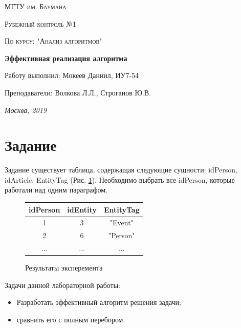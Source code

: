 \documentclass[12pt]{report}
\begin{document}
\begin{titlepage}
	\centering
	{\scshape\LARGE МГТУ им. Баумана \par}
	\vspace{3cm}
	{\scshape\Large Рубежный контроль №1\par}
	\vspace{0.5cm}	
	{\scshape\Large По курсу: "Анализ алгоритмов"\par}
	\vspace{1.5cm}
	{\huge\bfseries Эффективная реализация алгоритма\par}
	\vspace{2cm}
	\Large Работу выполнил: Мокеев Даниил, ИУ7-54\par
	\vspace{0.5cm}
	\Large Преподаватели:  Волкова Л.Л., Строганов Ю.В.\par

	\vfill
	\large \textit {Москва, 2019} \par
\end{titlepage}

\tableofcontents

\newpage
\chapter*{Задание}

Задание существует таблица, содержащая следующие сущности: idPerson, idArticle, EntityTag (Рис. \ref{exp}). Необходимо выбрать все idPerson, которые работали над одним параграфом.
\begin{figure}[h!]
	\begin{center}
		\begin{tabular}{|c c c|} 
			\hline
			idPerson  & idEntity & EntityTag\\ [0.5ex] 
			\hline\hline
			1 & 3 & "Event"  \\
			\hline
			2 & 6 & "Person"\\
			\hline
			... & ... & ... \\
			\hline
		\end{tabular}
	\end{center}
	\caption{Результаты эксперемента}
	\label{exp}
\end{figure}

Задачи данной лабораторной работы:
\begin{itemize}
	\item Разработать эффективный алгоритм решения задачи;
	\item сравнить его с полным перебором.
\end{itemize}
\end{document}
